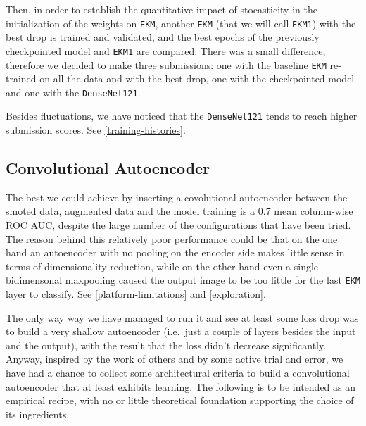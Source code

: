 \documentclass[aps,twocolumn,secnumarabic,nobalancelastpage,amsmath,amssymb,
nofootinbib]{revtex4}
\begin{document}
Then, in order to establish the quantitative impact of stocasticity in
the initialization of the weights on \texttt{EKM}, another \texttt{EKM} (that we will call \texttt{EKM1}) with the best drop is trained and validated, and the best epochs of the previously checkpointed model and \texttt{EKM1} are compared. There was a small difference, therefore we decided to make three submissions: one with the baseline \texttt{EKM} re-trained on all the data and with the best drop,
one with the checkpointed model and one with the \texttt{DenseNet121}. \newline

Besides fluctuations, we have noticed that the \texttt{DenseNet121}
tends to reach higher submission scores. See \ref{training-histories}.

\subsection{Convolutional Autoencoder}\label{ae}

The best we could achieve by inserting a covolutional autoencoder
between the smoted data, augmented data and the model training is a
0.7 mean column-wise ROC AUC, despite the large number of the
configurations that have been tried. The reason behind this relatively
poor performance could be that on the one hand an autoencoder with no
pooling on the encoder side makes little sense in terms of
dimensionality reduction, while on the other hand even a single
bidimensonal maxpooling caused the output image to be too little for the
last \texttt{EKM} layer to classify. See \ref{platform-limitations} and \ref{exploration}. \newline

The only way way we have managed to run it and see at least some loss
drop was to build a very shallow autoencoder (i.e.~just a couple of
layers besides the input and the output), with the result that the loss
didn't decrease significantly. Anyway, inspired by the work of others
and by some active trial and error, we have had a chance to collect some
architectural criteria to build a convolutional autoencoder that at
least exhibits learning. The following is to be intended as an empirical
recipe, with no or little theoretical foundation supporting the choice
of its ingredients. \newline
\end{document}
